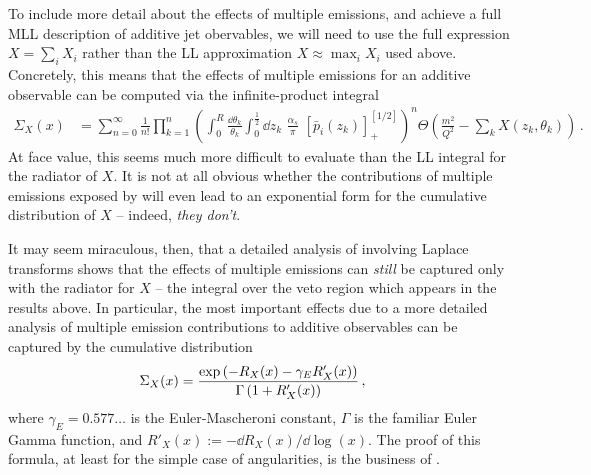 To include more detail about the effects of multiple emissions, and achieve a full MLL description of additive jet obervables, we will need to use the full expression \(X = \sum_i X_i\) rather than the LL approximation \(X \approx \max_i X_i\) used above.
%
Concretely, this means that the effects of multiple emissions for an additive observable can be computed via the infinite-product integral
\begin{align}
    \label{eq:series-multiple-emissions}
    \Sigma_X(x)
    &=
    \sum_{n = 0}^{\infty}
    \frac{1}{n!}
    \prod_{k = 1}^n
    \left(
        \int_0^R \frac{\dd\theta_k}{\theta_k}
        \int_0^{\frac{1}{2}} \dd z_k
        \,\,
        \frac{\alpha_s}{\pi}
        \,\,
        [\bar{p}_i(z_k)]_+^{[1/2]}
    \right)^n
    \Theta\left(
        \frac{m^2}{Q^2} - \sum_k X(z_k, \theta_k)
    \right)
    \,.
\end{align}
%
At face value, this seems much more difficult to evaluate than the LL integral for the radiator of \(X\).
%
It is not at all obvious whether the contributions of multiple emissions exposed by  will even lead to an exponential form for the cumulative distribution of \(X\) --
indeed, \textit{they don't}.

It may seem miraculous, then, that a detailed analysis of  involving Laplace transforms shows that the effects of multiple emissions can \textit{still} be captured only with the radiator for \(X\) -- the integral over the veto region which appears in the  results above.
%
In particular, the most important effects due to a more detailed analysis of multiple emission contributions to additive observables can be captured by the cumulative distribution
\begin{align}
    \label{eq:resummed-multiple-emissions}
    \Sigma_X(x)
    &=
    \frac{\exp\le(-R_X(x) - \gamma_E R'_X(x)\ri)}{\Gamma\le(1 + R'_X(x)\ri)}
    \,,
\end{align}
where \(\gamma_E=0.577\dots\) is the Euler-Mascheroni constant, \(\Gamma\) is the familiar Euler Gamma function, and \(R'_X(x) := -\dd R_X(x) / \dd \log(x)\).
%
The proof of this formula, at least for the simple case of angularities, is the business of .



